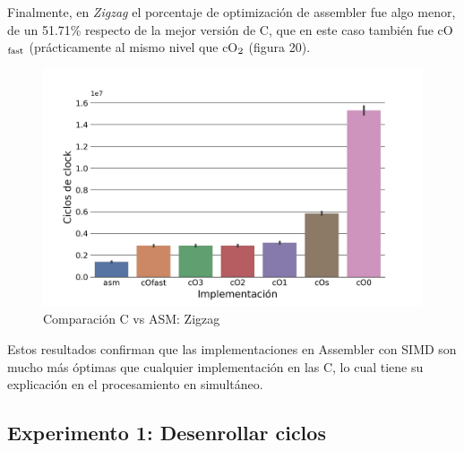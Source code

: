 \documentclass[a4paper]{article}
\begin{document}
Finalmente, en \textit{Zigzag} el porcentaje de optimización de assembler fue algo menor, de un 51.71\% respecto de la mejor versión de C, que en este caso también fue cO$\textsubscript{fast}$ (prácticamente al mismo nivel que cO$\textsubscript{2}$ (figura 20).

\begin{figure}[!htb]
  \begin{center}
	\includegraphics[scale=0.1]{img/exp0zigzag.jpg}
	\caption{Comparación C vs ASM: Zigzag}
  \end{center}
\end{figure}

Estos resultados confirman que las implementaciones en Assembler con SIMD son mucho más óptimas que cualquier implementación en las C, lo cual tiene su explicación en el procesamiento en simultáneo.

\subsection{Experimento 1: Desenrollar ciclos}
\end{document}
